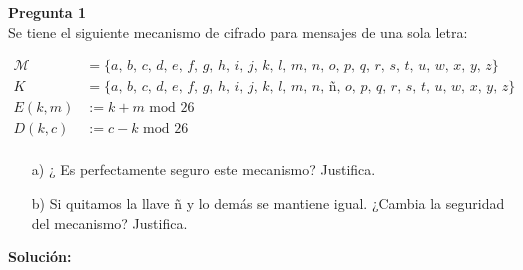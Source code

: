 \documentclass{article}
\newenvironment{problem}[2][Pregunta]
    { \begin{mdframed}[backgroundcolor=gray!20] \textbf{#1 #2} \\}
    {  \end{mdframed}}
\begin{document}

\begin{problem}
  {1} Se tiene el siguiente mecanismo de cifrado para mensajes de una sola letra:

  \begin{align*}
    \mathcal{M} &= \{a,\,b,\,c,\,d,\,e,\,f,\,g,\,h,\,i,\,j,\,k,\,l,\,m,\,n,\,o,\,p,\,q,\,r,\,s,\,t,\,u,\,w,\,x,\,y,\,z\} \\
    K &= \{a,\,b,\,c,\,d,\,e,\,f,\,g,\,h,\,i,\,j,\,k,\,l,\,m,\,n,\,ñ,\,o,\,p,\,q,\,r,\,s,\,t,\,u,\,w,\,x,\,y,\,z\}\\
    E(k, m) &:= k+m\text{ mod } 26\\
    D(k, c) &:= c-k \text{ mod } 26\\
  \end{align*}


  \begin{enumerate}
  \item[a)] ¿ Es perfectamente seguro este mecanismo? Justifica.
  \item[b)] Si quitamos la llave ñ y lo demás se mantiene igual. ¿Cambia la seguridad
    del mecanismo? Justifica.
  \end{enumerate}
\end{problem}

{\bf Solución:}
\end{document}
